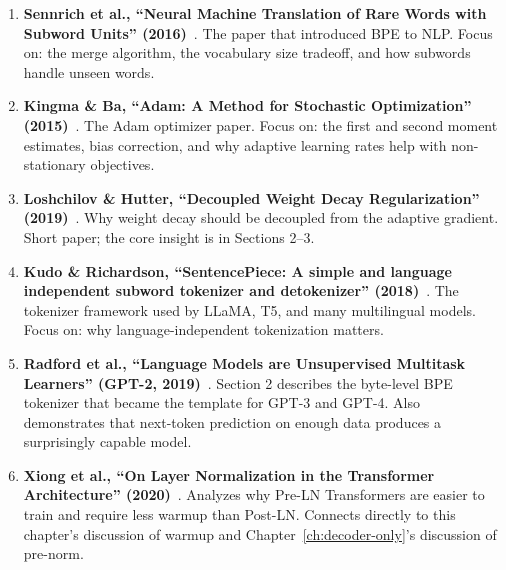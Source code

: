 \begin{enumerate}
  \item \textbf{Sennrich et al., ``Neural Machine Translation of Rare Words with Subword Units'' (2016)}~\cite{sennrich2016bpe}. The paper that introduced BPE to NLP. Focus on: the merge algorithm, the vocabulary size tradeoff, and how subwords handle unseen words.

  \item \textbf{Kingma \& Ba, ``Adam: A Method for Stochastic Optimization'' (2015)}~\cite{kingma2015adam}. The Adam optimizer paper. Focus on: the first and second moment estimates, bias correction, and why adaptive learning rates help with non-stationary objectives.

  \item \textbf{Loshchilov \& Hutter, ``Decoupled Weight Decay Regularization'' (2019)}~\cite{loshchilov2019adamw}. Why weight decay should be decoupled from the adaptive gradient. Short paper; the core insight is in Sections 2--3.

  \item \textbf{Kudo \& Richardson, ``SentencePiece: A simple and language independent subword tokenizer and detokenizer'' (2018)}~\cite{kudo2018sentencepiece}. The tokenizer framework used by LLaMA, T5, and many multilingual models. Focus on: why language-independent tokenization matters.

  \item \textbf{Radford et al., ``Language Models are Unsupervised Multitask Learners'' (GPT-2, 2019)}~\cite{radford2019language}. Section 2 describes the byte-level BPE tokenizer that became the template for GPT-3 and GPT-4. Also demonstrates that next-token prediction on enough data produces a surprisingly capable model.

  \item \textbf{Xiong et al., ``On Layer Normalization in the Transformer Architecture'' (2020)}~\cite{xiong2020layernorm}. Analyzes why Pre-LN Transformers are easier to train and require less warmup than Post-LN. Connects directly to this chapter's discussion of warmup and Chapter~\ref{ch:decoder-only}'s discussion of pre-norm.
\end{enumerate}
